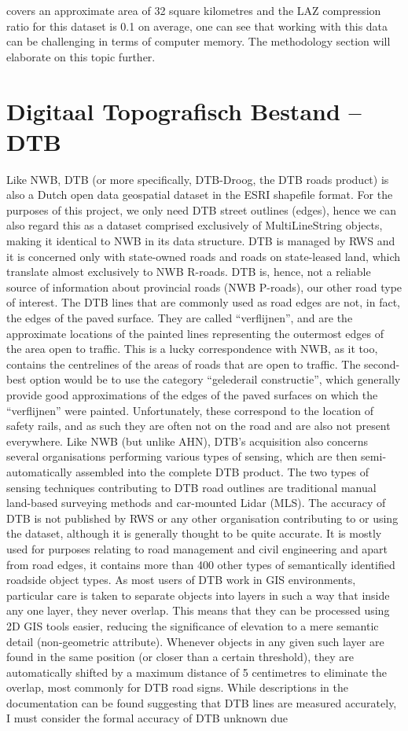 covers an approximate area of 32 square kilometres and the LAZ compression ratio for this dataset is 0.1 on average, one can see that working with this data can be challenging in terms of computer memory. The methodology section will elaborate on this topic further.

\section*{Digitaal Topografisch Bestand – DTB}

Like NWB, DTB (or more specifically, DTB-Droog, the DTB roads product) is also a Dutch open data geospatial dataset in the ESRI shapefile format. For the purposes of this project, we only need DTB street outlines (edges), hence we can also regard this as a dataset comprised exclusively of MultiLineString objects, making it identical to NWB in its data structure. DTB is managed by RWS and it is concerned only with state-owned roads and roads on state-leased land, which translate almost exclusively to NWB R-roads. DTB is, hence, not a reliable source of information about provincial roads (NWB P-roads), our other road type of interest. The DTB lines that are commonly used as road edges are not, in fact, the edges of the paved surface. They are called “verflijnen”, and are the approximate locations of the painted lines representing the outermost edges of the area open to traffic. This is a lucky correspondence with NWB, as it too, contains the centrelines of the areas of roads that are open to traffic. The second-best option would be to use the category “gelederail constructie”, which generally provide good approximations of the edges of the paved surfaces on which the “verflijnen” were painted. Unfortunately, these correspond to the location of safety rails, and as such they are often not on the road and are also not present everywhere. Like NWB (but unlike AHN), DTB’s acquisition also concerns several organisations performing various types of sensing, which are then semi-automatically assembled into the complete DTB product. The two types of sensing techniques contributing to DTB road outlines are traditional manual land-based surveying methods and car-mounted Lidar (MLS). The accuracy of DTB is not published by RWS or any other organisation contributing to or using the dataset, although it is generally thought to be quite accurate. It is mostly used for purposes relating to road management and civil engineering and apart from road edges, it contains more than 400 other types of semantically identified roadside object types. As most users of DTB work in GIS environments, particular care is taken to separate objects into layers in such a way that inside any one layer, they never overlap. This means that they can be processed using 2D GIS tools easier, reducing the significance of elevation to a mere semantic detail (non-geometric attribute). Whenever objects in any given such layer are found in the same position (or closer than a certain threshold), they are automatically shifted by a maximum distance of 5 centimetres to eliminate the overlap, most commonly for DTB road signs. While descriptions in the documentation can be found suggesting that DTB lines are measured accurately, I must consider the formal accuracy of DTB unknown due 